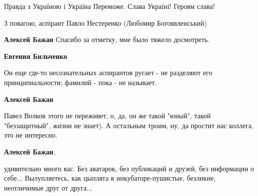 \begin{itemize}
{Правда з Україною і Україна Переможе. Слава Україні! Героям слава!

З повагою, аспірант Павло Нестеренко (Любомир Богоявленський)
}

\begin{itemize}
 
\textbf{Алексей Бажан} Спасибо за отметку, мне было тяжело досмотреть.

 
\textbf{Евгения Бильченко} 

Он еще где-то несознательных аспирантов ругает - не разделяют его
принципиальности; фамилий - пока - не называет.


 
\textbf{Алексей Бажан} 

Павел Волков этого не переживет, о, да, он же такой "юный", такой
"беззащитный", жизни не знает). А остальным троим, ну, да простит нас коллега,
это не интересно.


 
\textbf{Алексей Бажан},

удивительно много вас. Без аватарок, без публикаций и друзей, без информации о
себе... Вылупляетесь, как цыплята в инкубаторе-пушистые, безликие, неотличимые
друг от друга...

 


\end{itemize}
\end{itemize}
